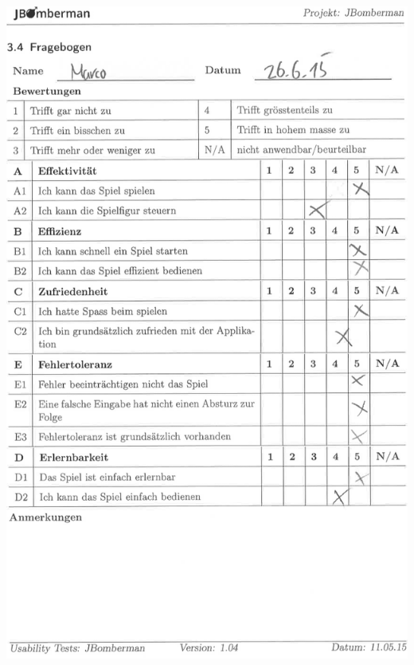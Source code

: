 \documentclass[11pt]{scrartcl}
\begin{document}
\includegraphics[scale=0.85]{Marco_RC2}
\end{document}
